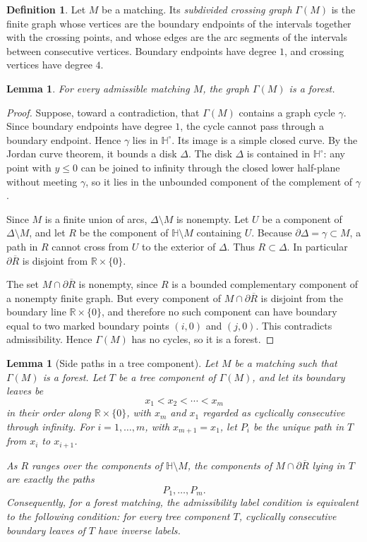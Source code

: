 \documentclass[12pt]{article}
\newcommand{\RR}{\mathbb{R}}
\newcommand{\HH}{\mathbb{H}}
\newcommand{\bd}{\partial}
\newtheorem{lemma}[theorem]{Lemma}
\theoremstyle{definition}
\newtheorem{definition}[theorem]{Definition}
\begin{document}
\begin{definition}
Let \(M\) be a matching.  Its \emph{subdivided crossing graph} \(\Gamma(M)\) is the finite graph whose vertices are the boundary endpoints of the intervals together with the crossing points, and whose edges are the arc segments of the intervals between consecutive vertices.  Boundary endpoints have degree \(1\), and crossing vertices have degree \(4\).
\end{definition}

\begin{lemma}\label{lem:forest}
For every admissible matching \(M\), the graph \(\Gamma(M)\) is a forest.
\end{lemma}

\begin{proof}
Suppose, toward a contradiction, that \(\Gamma(M)\) contains a graph cycle \(\gamma\).  Since boundary endpoints have degree \(1\), the cycle cannot pass through a boundary endpoint.  Hence \(\gamma\) lies in \(\HH^\circ\).  Its image is a simple closed curve.  By the Jordan curve theorem, it bounds a disk \(\Delta\).  The disk \(\Delta\) is contained in \(\HH^\circ\): any point with \(y\leq 0\) can be joined to infinity through the closed lower half-plane without meeting \(\gamma\), so it lies in the unbounded component of the complement of \(\gamma\).

Since \(M\) is a finite union of arcs, \(\Delta\setminus M\) is nonempty.  Let \(U\) be a component of \(\Delta\setminus M\), and let \(R\) be the component of \(\HH\setminus M\) containing \(U\).  Because \(\bd\Delta=\gamma\subset M\), a path in \(R\) cannot cross from \(U\) to the exterior of \(\Delta\).  Thus \(R\subset\Delta\).  In particular \(\bd\overline R\) is disjoint from \(\RR\times\{0\}\).

The set \(M\cap\bd\overline R\) is nonempty, since \(R\) is a bounded complementary component of a nonempty finite graph.  But every component of \(M\cap\bd\overline R\) is disjoint from the boundary line \(\RR\times\{0\}\), and therefore no such component can have boundary equal to two marked boundary points \((i,0)\) and \((j,0)\).  This contradicts admissibility.  Hence \(\Gamma(M)\) has no cycles, so it is a forest.
\end{proof}

\begin{lemma}[Side paths in a tree component]\label{lem:sidepaths}
Let \(M\) be a matching such that \(\Gamma(M)\) is a forest.  Let \(T\) be a tree component of \(\Gamma(M)\), and let its boundary leaves be
\[
x_1<x_2<\cdots <x_m
\]
in their order along \(\RR\times\{0\}\), with \(x_m\) and \(x_1\) regarded as cyclically consecutive through infinity.  For \(i=1,\dots,m\), with \(x_{m+1}=x_1\), let \(P_i\) be the unique path in \(T\) from \(x_i\) to \(x_{i+1}\).

As \(R\) ranges over the components of \(\HH\setminus M\), the components of \(M\cap\bd\overline R\) lying in \(T\) are exactly the paths
\[
P_1,\dots,P_m.
\]
Consequently, for a forest matching, the admissibility label condition is equivalent to the following condition: for every tree component \(T\), cyclically consecutive boundary leaves of \(T\) have inverse labels.
\end{lemma}
\end{document}
